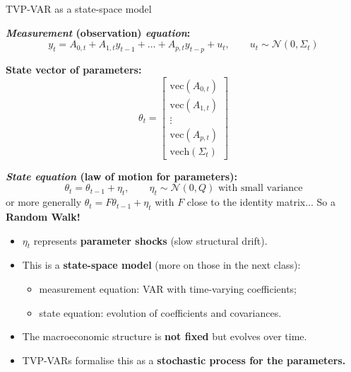 \documentclass{beamer}
\begin{document}
\begin{frame}{TVP-VAR as a state-space model}
\scriptsize

\textbf{\textit{Measurement} (observation) \textit{equation}:}
\[
y_t = A_{0,t} + A_{1,t} y_{t-1} + \dots + A_{p,t} y_{t-p} + u_t,
\qquad u_t \sim \mathcal{N}(0,\Sigma_t)
\]

\textbf{State vector of parameters:}
\[
\theta_t =
\begin{bmatrix}
\mathrm{vec}(A_{0,t}) \\
\mathrm{vec}(A_{1,t}) \\
\vdots \\
\mathrm{vec}(A_{p,t}) \\
\mathrm{vech}(\Sigma_t)
\end{bmatrix}
\]

\textbf{\textit{State equation} (law of motion for parameters):}
\[
\theta_t = \theta_{t-1} + \eta_t,
\qquad \eta_t \sim \mathcal{N}(0,Q) \text{ with small variance}
\]
or more generally $\theta_t = F \theta_{t-1} + \eta_t$ with $F$ close to the identity matrix... So a \textbf{Random Walk!}

\begin{itemize}
  \item $\eta_t$ represents \textbf{parameter shocks} (slow structural drift).
  \item This is a \textbf{state-space model} (more on those in the next class):
        \begin{itemize}
        \footnotesize
          \item measurement equation: VAR with time-varying coefficients;
          \item state equation: evolution of coefficients and covariances.
        \end{itemize}
\end{itemize}

\begin{itemize}
  \item The macroeconomic structure is \textbf{not fixed} but evolves over time.
  \item TVP-VARs formalise this as a\textbf{ stochastic process for the parameters.}
\end{itemize}

\end{frame}
\end{document}
